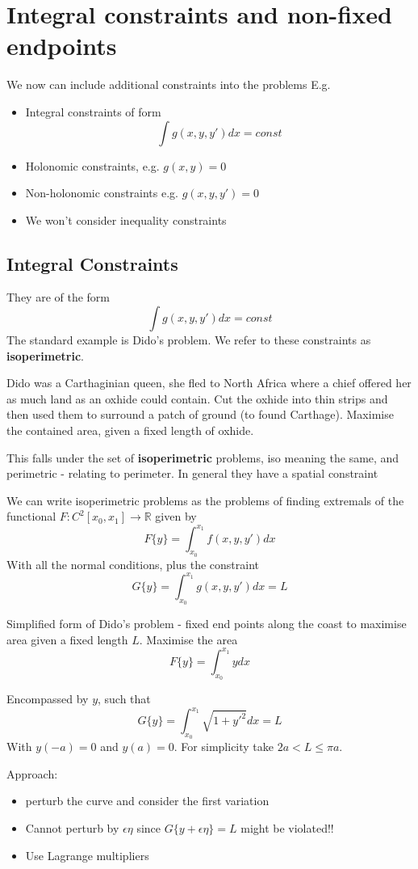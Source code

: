 \documentclass{X:/Documents/Coding/Latex/myassignment}
\begin{document}
\section{Integral constraints and non-fixed endpoints}
We now can include additional constraints into the problems
E.g.
\begin{itemize}
	\item Integral constraints of form
	\[\int g(x,y,y') dx = const\]
	\item Holonomic constraints, e.g. $g(x,y) = 0$
	\item Non-holonomic constraints e.g. $g(x,y,y') =0$
	\item We won't consider inequality constraints
\end{itemize}
\subsection{Integral Constraints}
They are of the form
\[\int g(x,y,y') dx = const\]
The standard example is Dido's problem. We refer to these constraints as \textbf{isoperimetric}.

Dido was a Carthaginian queen, she fled to North Africa where a chief offered her as much land as an oxhide could contain. Cut the oxhide into thin strips and then used them to surround a patch of ground (to found Carthage). Maximise the contained area, given a fixed length of oxhide.

This falls under the set of \textbf{isoperimetric} problems, iso meaning the same, and perimetric - relating to perimeter.
In general they have a spatial constraint

We can write isoperimetric problems as the problems of finding extremals of the functional $F: C^2[x_0,x_1] \to \mathbb{R}$ given by
\[F\{y\} = \int_{x_0}^{x_1} f(x,y,y') dx\]
With all the normal conditions, plus the constraint
\[G\{y\} = \int_{x_0}^{x_1} g(x,y,y') dx = L\]



Simplified form of Dido's problem - fixed end points along the coast to maximise area given a fixed length $L$. 
Maximise the area
\[F\{y\} = \int_{x_0}^{x_1} y dx\]

Encompassed by $y$, such that
\[G\{y\} = \int_{x_0}^{x_1} \sqrt{1+y'^2} dx = L\]
With $y(-a) = 0$ and $y(a) = 0$.
For simplicity take $2a < L \leq \pi a$.

Approach:
\begin{itemize}
	\item perturb the curve and consider the first variation
	\item Cannot perturb by $\epsilon \eta$ since $G\{y + \epsilon \eta\} = L$ might be violated!!
	\item Use Lagrange multipliers
\end{itemize}
\end{document}

